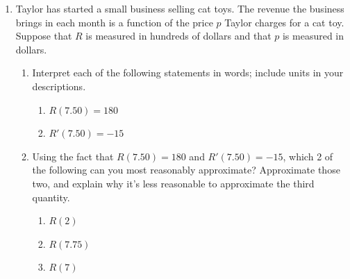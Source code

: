 \documentclass{article}
\begin{document}
\begin{enumerate}[resume]
\item  \label{interpret-derivatives-cat-toys} %

  Taylor has started a small business selling cat toys. The revenue the business brings in each month is a function of the price $p$ Taylor charges for a cat toy. Suppose that $R$ is measured in hundreds of dollars and that $p$ is measured in dollars.

  \begin{enumerate}
  \item Interpret each of the following statements in words; include units in your descriptions.
    \begin{enumerate}
    \item
      \begin{problem}[\stretch{0.75}]
        $R(7.50) = 180$
      \end{problem}

    \item
      \begin{problem}[\stretch{0.75}]
        $R'(7.50) = -15$
      \end{problem}

    \end{enumerate}

  \item Using the fact that $R(7.50) = 180$ and $R'(7.50) = -15$, which 2 of the following can you most reasonably approximate? Approximate those two, and explain why it's less reasonable to approximate the third quantity.
    \begin{enumerate}
    \item
      \begin{problem}[\vfill]
        $R(2)$
      \end{problem}

    \item
      \begin{problem}[\vfill]
        $R(7.75)$
      \end{problem}

    \item
      \begin{problem}[\vfill\newpage]
        $R(7)$
      \end{problem}

    \end{enumerate}

  \end{enumerate}


\end{enumerate}
\end{document}
